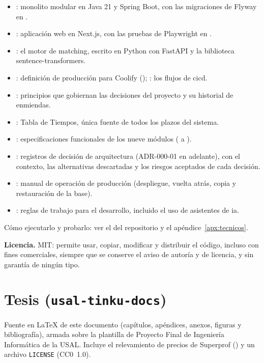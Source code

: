 \begin{itemize}
    \item {}: monolito modular en Java 21 y Spring Boot,
          con las migraciones de Flyway en
          .
    \item {}: aplicación web en Next.js, con las pruebas
          de Playwright en .
    \item {}: el motor de \gls{matching}, escrito
          en Python con FastAPI y la biblioteca sentence-transformers.
    \item {}: definición de producción para Coolify
          (); :
          los flujos de \gls{cicd}.
    \item {}: principios que gobiernan
          las decisiones del proyecto y su historial de enmiendas.
    \item {}: Tabla de Tiempos, única
          fuente de todos los plazos del sistema.
    \item {}: especificaciones funcionales de los nueve
          módulos ( a ).
    \item {}: registros de decisión de arquitectura
          (ADR-000-01 en adelante), con el contexto, las alternativas
          descartadas y los riesgos aceptados de cada decisión.
    \item {}: manual de
          operación de producción (despliegue, vuelta atrás, copia y
          restauración de la base).
    \item {}: reglas de trabajo para el desarrollo,
          incluido el uso de asistentes de \gls{ia}.
\end{itemize}

Cómo ejecutarlo y probarlo: ver el  del repositorio y
el apéndice~\ref{apx:tecnicos}.

\textbf{Licencia.} MIT: permite usar, copiar, modificar y distribuir el
código, incluso con fines comerciales, siempre que se conserve el aviso
de autoría y de licencia, y sin garantía de ningún tipo.

\section{Tesis (\texttt{usal-tinku-docs})}


Fuente en \LaTeX{} de este documento (capítulos, apéndices, anexos,
figuras y bibliografía), armada sobre la plantilla de Proyecto Final de
Ingeniería Informática de la USAL. Incluye el relevamiento de precios de
Superprof () y un archivo
\texttt{LICENSE} (CC0~1.0).
